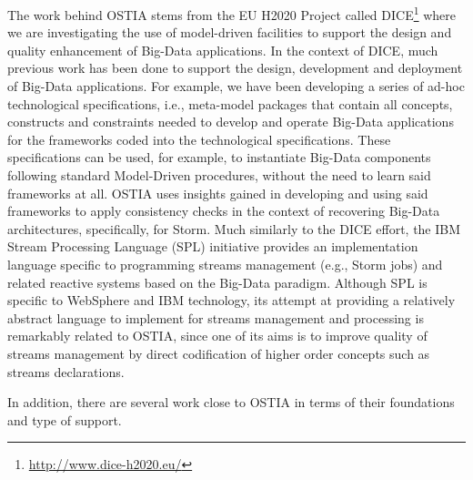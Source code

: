 
The work behind OSTIA stems from the EU H2020 Project called DICE\footnote{\url{http://www.dice-h2020.eu/}} where we are investigating the use of model-driven facilities to support the design and quality enhancement of Big-Data applications. In the context of DICE, much previous work has been done to support the design, development and deployment of Big-Data applications. For example, we have been developing a series of ad-hoc technological specifications, i.e., meta-model packages that contain all concepts, constructs and constraints needed to develop and operate Big-Data applications for the frameworks coded into the technological specifications. These specifications can be used, for example, to instantiate Big-Data components following standard Model-Driven procedures, without the need to learn said frameworks at all. OSTIA uses insights gained in developing and using said frameworks to apply consistency checks in the context of recovering Big-Data architectures, specifically, for Storm. Much similarly to the DICE effort, the IBM Stream Processing Language (SPL) initiative \cite{ibmspl} provides an implementation language specific to programming streams management (e.g., Storm jobs) and related reactive systems based on the Big-Data paradigm. Although SPL is specific to WebSphere and IBM technology, its attempt at providing a relatively abstract language to implement for streams management and processing is remarkably related to OSTIA, since one of its aims is to improve quality of streams management by direct codification of higher order concepts such as streams declarations.

In addition, there are several work close to OSTIA in terms of their foundations and type of support. 

